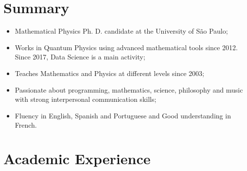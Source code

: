 \documentclass[11pt,a4paper,sans]{moderncv}        %
\begin{document}
\makecvtitle

\section{Summary}

\begin{itemize} 
\item Mathematical Physics Ph. D. candidate at the University of S\~{a}o Paulo;
\item Works in Quantum Physics using advanced mathematical tools since 2012. Since 2017, Data Science is a main activity;
\item Teaches Mathematics and Physics at different levels since 2003; 
\item Passionate about programming, mathematics, science, philosophy and music with strong interpersonal communication skills;
\item Fluency in English, Spanish and Portuguese and Good understanding in French.
\end{itemize} 

\section{Academic Experience}

\vspace{3pt}
\end{document}
